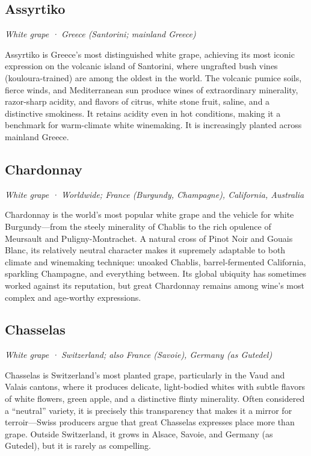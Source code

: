 \subsection*{Assyrtiko}
\textit{White grape · Greece (Santorini; mainland Greece)}\par\smallskip

Assyrtiko is Greece’s most distinguished white grape, achieving its most iconic expression on the volcanic island of Santorini, where ungrafted bush vines (kouloura-trained) are among the oldest in the world. The volcanic pumice soils, fierce winds, and Mediterranean sun produce wines of extraordinary minerality, razor-sharp acidity, and flavors of citrus, white stone fruit, saline, and a distinctive smokiness. It retains acidity even in hot conditions, making it a benchmark for warm-climate white winemaking. It is increasingly planted across mainland Greece.

\subsection*{Chardonnay}
\textit{White grape · Worldwide; France (Burgundy, Champagne), California, Australia}\par\smallskip

Chardonnay is the world’s most popular white grape and the vehicle for white Burgundy—from the steely minerality of Chablis to the rich opulence of Meursault and Puligny-Montrachet. A natural cross of Pinot Noir and Gouais Blanc, its relatively neutral character makes it supremely adaptable to both climate and winemaking technique: unoaked Chablis, barrel-fermented California, sparkling Champagne, and everything between. Its global ubiquity has sometimes worked against its reputation, but great Chardonnay remains among wine’s most complex and age-worthy expressions.

\subsection*{Chasselas}
\textit{White grape · Switzerland; also France (Savoie), Germany (as Gutedel)}\par\smallskip

Chasselas is Switzerland’s most planted grape, particularly in the Vaud and Valais cantons, where it produces delicate, light-bodied whites with subtle flavors of white flowers, green apple, and a distinctive flinty minerality. Often considered a “neutral” variety, it is precisely this transparency that makes it a mirror for terroir—Swiss producers argue that great Chasselas expresses place more than grape. Outside Switzerland, it grows in Alsace, Savoie, and Germany (as Gutedel), but it is rarely as compelling.

